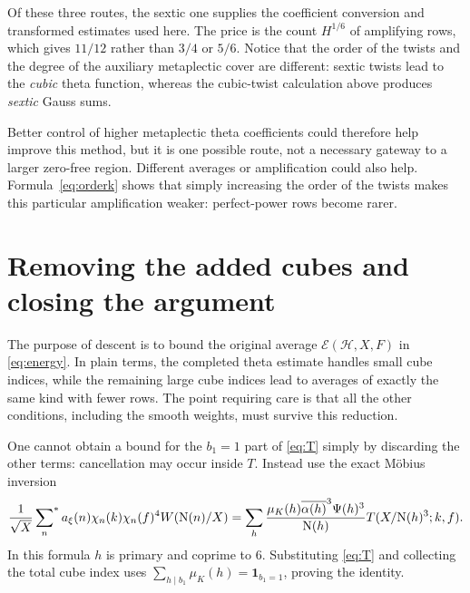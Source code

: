 \documentclass[11pt]{article}
\newcommand{\N}{\mathrm N}
\newcommand{\muk}{\mu_K}
\newcommand{\E}{\mathcal E}
\newcommand{\ind}{\mathbf 1}
\newcommand{\starred}{\sideset{}{^*}\sum}
\numberwithin{equation}{section}
\begin{document}
Of these three routes, the sextic one supplies the coefficient conversion
and transformed estimates used here. The price is the count $H^{1/6}$ of
amplifying rows, which gives $11/12$ rather than $3/4$ or $5/6$.
Notice that the order of the twists and the degree of the auxiliary
metaplectic cover are different: sextic twists lead to the \emph{cubic}
theta function, whereas the cubic-twist calculation above produces
\emph{sextic} Gauss sums.

Better control of higher metaplectic theta coefficients could therefore
help improve this method, but it is one possible route, not a necessary
gateway to a larger zero-free region. Different averages or amplification
could also help. Formula~\eqref{eq:orderk} shows that simply increasing
the order of the twists makes this particular amplification weaker:
perfect-power rows become rarer.

\section{Removing the added cubes and closing the argument}\label{sec:descent}

The purpose of descent is to bound the original average
$\E(\mathcal H,X,F)$ in \eqref{eq:energy}. In plain terms, the completed
theta estimate handles small cube indices, while the remaining large
cube indices lead to averages of exactly the same kind with fewer rows.
The point requiring care is that all the other conditions, including
the smooth weights, must survive this reduction.

One cannot obtain a bound for the $b_1=1$ part of \eqref{eq:T} simply
by discarding the other terms: cancellation may occur inside $T$.
Instead use the exact M\"obius inversion
\begin{equation}\label{eq:inversion}
 \frac1{\sqrt X}\starred_n a_\xi(n)\chi_n(k)\chi_n(f)^4W(\N(n)/X)
 =\sum_h\frac{\muk(h)\overline{\alpha(h)}^3\Psi(h)^3}{\N(h)}
           T(X/\N(h)^3;k,f).
\end{equation}
In this formula $h$ is primary and coprime to $6$. Substituting
\eqref{eq:T} and collecting the total cube index uses
$\sum_{h\mid b_1}\muk(h)=\ind_{b_1=1}$, proving the identity.
\end{document}
